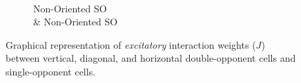 \documentclass[journal,onecolumn]{IEEEtran}
\begin{document}
{\begin{figure}[htbp!]
\begin{subfigure}[b]{0.2\textwidth}
            \caption{\\ Non-Oriented SO \\ \& Non-Oriented SO}
    \end{subfigure}%
    \caption{Graphical representation of \textit{excitatory} interaction weights ($J$) between vertical, diagonal, and horizontal double-opponent cells and single-opponent cells.}
\end{figure}
\clearpage
}
\end{document}
